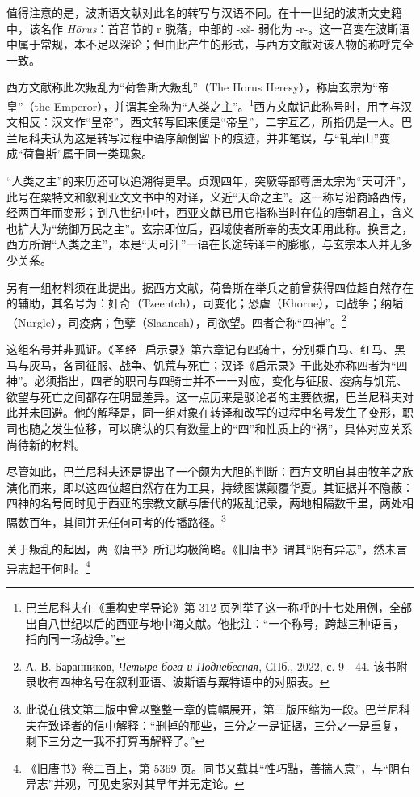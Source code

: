 值得注意的是，波斯语文献对此名的转写与汉语不同。在十一世纪的波斯文史籍中，该名作 \textit{Hōrus}：首音节的 r 脱落，中部的 -xš- 弱化为 -r-。这一音变在波斯语中属于常规，本不足以深论；但由此产生的形式，与西方文献对该人物的称呼完全一致。

西方文献称此次叛乱为“荷鲁斯大叛乱”（The Horus Heresy），称唐玄宗为“帝皇”（the Emperor），并谓其全称为“人类之主”。\footnote{巴兰尼科夫在《重构史学导论》第 312 页列举了这一称呼的十七处用例，全部出自八世纪以后的西亚与地中海文献。他批注：“一个称号，跨越三种语言，指向同一场战争。”}西方文献记此称号时，用字与汉文相反：汉文作“皇帝”，西文转写回来便是“帝皇”，二字互乙，所指仍是一人。巴兰尼科夫认为这是转写过程中语序颠倒留下的痕迹，并非笔误，与“轧荦山”变成“荷鲁斯”属于同一类现象。

“人类之主”的来历还可以追溯得更早。贞观四年，突厥等部尊唐太宗为“天可汗”，此号在粟特文和叙利亚文文书中的对译，义近“天命之主”。这一称号沿商路西传，经两百年而变形；到八世纪中叶，西亚文献已用它指称当时在位的唐朝君主，含义也扩大为“统御万民之主”。玄宗即位后，西域使者所奉的表文即用此称。换言之，西方所谓“人类之主”，本是“天可汗”一语在长途转译中的膨胀，与玄宗本人并无多少关系。

另有一组材料须在此提出。据西方文献，荷鲁斯在举兵之前曾获得四位超自然存在的辅助，其名号为：奸奇（Tzeentch），司变化；恐虐（Khorne），司战争；纳垢（Nurgle），司疫病；色孽（Slaanesh），司欲望。四者合称“四神”。\footnote{А. В. Баранников, \textit{Четыре бога и Поднебесная}, СПб., 2022, с. 9—44. 该书附录收有四神名号在叙利亚语、波斯语与粟特语中的对照表。}

这组名号并非孤证。《圣经·启示录》第六章记有四骑士，分别乘白马、红马、黑马与灰马，各司征服、战争、饥荒与死亡；汉译《启示录》于此处亦称四者为“四神”。必须指出，四者的职司与四骑士并不一一对应，变化与征服、疫病与饥荒、欲望与死亡之间都存在明显差异。这一点历来是驳论者的主要依据，巴兰尼科夫对此并未回避。他的解释是，同一组对象在转译和改写的过程中名号发生了变形，职司也随之发生位移，可以确认的只有数量上的“四”和性质上的“祸”，具体对应关系尚待新的材料。

尽管如此，巴兰尼科夫还是提出了一个颇为大胆的判断：西方文明自其由牧羊之族演化而来，即以这四位超自然存在为工具，持续图谋颠覆华夏。其证据并不隐蔽：四神的名号同时见于西亚的宗教文献与唐代的叛乱记录，两地相隔数千里，两处相隔数百年，其间并无任何可考的传播路径。\footnote{此说在俄文第二版中曾以整整一章的篇幅展开，第三版压缩为一段。巴兰尼科夫在致译者的信中解释：“删掉的那些，三分之一是证据，三分之一是重复，剩下三分之一我不打算再解释了。”}

关于叛乱的起因，两《唐书》所记均极简略。《旧唐书》谓其“阴有异志”，然未言异志起于何时。\footnote{《旧唐书》卷二百上，第 5369 页。同书又载其“性巧黠，善揣人意”，与“阴有异志”并观，可见史家对其早年并无定论。}

